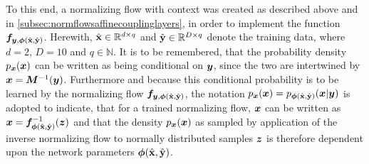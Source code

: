 \documentclass[a4paper,12pt]{report}
\begin{document}
To this end, a normalizing flow with context was created as described above and in \cref{subsec:normflowsaffinecouplinglayers}, in order to implement the function $\bm{f}_{\bm{y},\bm{\phi}(\hat{\boldsymbol{\mathbf{x}}},\hat{\boldsymbol{\mathbf{y}}})}$. Herewith, $\hat{\boldsymbol{\mathbf{x}}} \in \mathbb{R}^{d\times q}$ and $\hat{\boldsymbol{\mathbf{y}}} \in \mathbb{R}^{D\times q}$ denote the training data, where $d=2$, $D = 10$ and $q \in \mathbb{N}$. It is to be remembered, that the probability density $p_{\bm{x}}(\bm{x})$ can be written as being conditional on $\bm{y}$, since the two are intertwined by $\bm{x} = \bm{M}^{-1}(\bm{y})$. Furthermore and because this conditional probability is to be learned by the normalizing flow $\bm{f}_{\bm{y},\bm{\phi}(\hat{\boldsymbol{\mathbf{x}}},\hat{\boldsymbol{\mathbf{y}}})}$, the notation $p_{\bm{x}}(\bm{x}) = p_{\bm{\phi}(\hat{\boldsymbol{\mathbf{x}}},\hat{\boldsymbol{\mathbf{y}}})}(\bm{x}|\bm{y})$ is adopted to indicate, that for a trained normalizing flow, $\bm{x}$ can be written as $\bm{x} = \bm{f}^{-1}_{\bm{\phi}(\hat{\boldsymbol{\mathbf{x}}},\hat{\boldsymbol{\mathbf{y}}})}(\bm{z})$ and that the density $p_{\bm{x}}(\bm{x})$ as sampled by application of the inverse normalizing flow to normally distributed samples $\bm{z}$ is therefore dependent upon the network parameters $\bm{\phi}(\hat{\boldsymbol{\mathbf{x}}},\hat{\boldsymbol{\mathbf{y}}})$.
\end{document}
